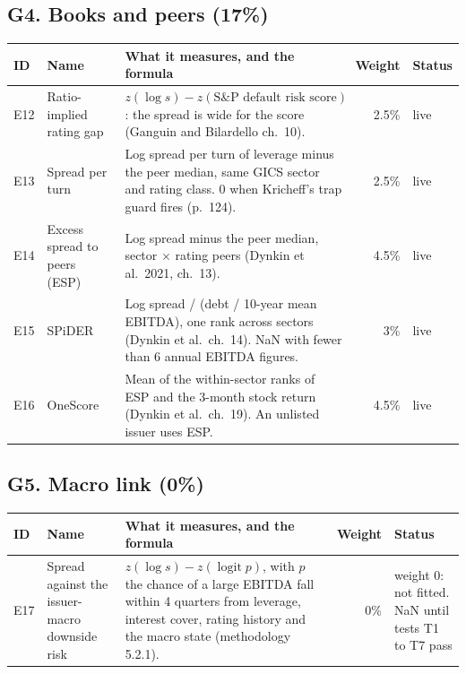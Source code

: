 \documentclass[10pt,a4paper]{article}
\newcommand{\live}{\textcolor{good}{live}}
\newcommand{\off}{\textcolor{bad}{weight 0}}
\begin{document}
\subsection*{G4. Books and peers (17\%)}
\begin{longtable}{lP{3.2cm}P{6.6cm}rP{2.4cm}}
\toprule
ID & Name & What it measures, and the formula & Weight & Status \\\midrule\endhead
E12 & Ratio-implied rating gap & $z(\log s) - z(\text{S\&P default risk score})$: the spread is wide for the score (Ganguin and Bilardello ch.~10). & 2.5\% & \live \\
E13 & Spread per turn & Log spread per turn of leverage minus the peer median, same GICS sector and rating class. 0 when Kricheff's trap guard fires (p.~124). & 2.5\% & \live \\
E14 & Excess spread to peers (ESP) & Log spread minus the peer median, sector $\times$ rating peers (Dynkin et al.\ 2021, ch.~13). & 4.5\% & \live \\
E15 & SPiDER & Log spread / (debt / 10-year mean EBITDA), one rank across sectors (Dynkin et al.\ ch.~14). NaN with fewer than 6 annual EBITDA figures. & 3\% & \live \\
E16 & OneScore & Mean of the within-sector ranks of ESP and the 3-month stock return (Dynkin et al.\ ch.~19). An unlisted issuer uses ESP. & 4.5\% & \live \\
\bottomrule
\end{longtable}

\subsection*{G5. Macro link (0\%)}
\begin{longtable}{lP{3.2cm}P{6.6cm}rP{2.4cm}}
\toprule
ID & Name & What it measures, and the formula & Weight & Status \\\midrule\endhead
E17 & Spread against the issuer-macro downside risk & $z(\log s) - z(\operatorname{logit} p)$, with $p$ the chance of a large EBITDA fall within 4 quarters from leverage, interest cover, rating history and the macro state (methodology 5.2.1). & 0\% & \off: not fitted. NaN until tests T1 to T7 pass \\
\bottomrule
\end{longtable}
\end{document}
